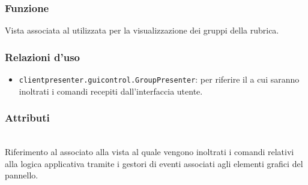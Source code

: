 \subsubsection*{Funzione}
Vista associata al  utilizzata per la visualizzazione dei gruppi della rubrica.

\subsubsection*{Relazioni d'uso}
\begin{itemize}
  \item \texttt{clientpresenter.guicontrol.GroupPresenter}: per riferire il  a cui saranno inoltrati i comandi recepiti dall'interfaccia utente.
\end{itemize}

\subsubsection*{Attributi}
\begin{description}
  \item{}\\
  Riferimento al  associato alla vista al quale vengono inoltrati i comandi relativi alla logica applicativa tramite i gestori di eventi associati agli elementi grafici del pannello.
\end{description}

